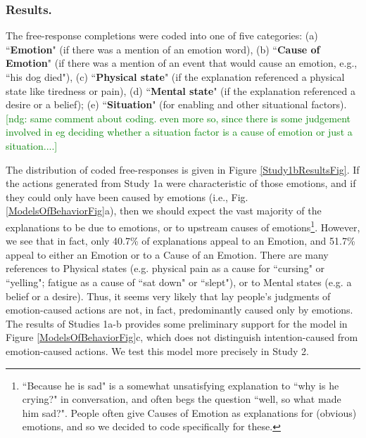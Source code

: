 \documentclass[10pt,letterpaper]{article}
\newcommand{\ndg}[1]{\textcolor{Green}{[ndg: #1]}}
\begin{document}
\subsubsection{Results.} 
The free-response completions were coded into one of five categories: (a) ``\textbf{Emotion}" (if there was a mention of an emotion word), (b) ``\textbf{Cause of Emotion}" (if there was a mention of an event that would cause an emotion, e.g., ``his dog died"), (c) ``\textbf{Physical state}" (if the explanation referenced a physical state like tiredness or pain), (d) ``\textbf{Mental state}" (if the explanation referenced a desire or a belief); (e) ``\textbf{Situation}" (for enabling and other situational factors). 
\ndg{same comment about coding. even more so, since there is some judgement involved in eg deciding whether a situation factor is a cause of emotion or just a situation....}


The distribution of coded free-responses is given in Figure \ref{Study1bResultsFig}. %
If the actions generated from Study 1a were characteristic of those emotions, and if they could only have been caused by emotions (i.e., Fig. \ref{ModelsOfBehaviorFig}a), then we should expect the vast majority of the explanations to be due to emotions, or to upstream causes of emotions\footnote{``Because he is sad" is a somewhat unsatisfying explanation to ``why is he crying?" in conversation, and often begs the question ``well, so what made him sad?". People often give Causes of Emotion as explanations for (obvious) emotions, and so we decided to code specifically for these.}. However, we see that in fact, only 40.7\% of explanations appeal to an Emotion, and 51.7\% appeal to either an Emotion or to a Cause of an Emotion. There are many references to Physical states (e.g. physical pain as a cause for ``cursing" or ``yelling"; fatigue as a cause of ``sat down" or ``slept"), or to Mental states (e.g. a belief or a desire). Thus, it seems very likely that lay people's judgments of emotion-caused actions are not, in fact, predominantly caused only by emotions. 
The results of Studies 1a-b provides some preliminary support for the model in Figure \ref{ModelsOfBehaviorFig}c, which does not distinguish intention-caused from emotion-caused actions. 
We test this model more precisely in Study 2.
\end{document}
